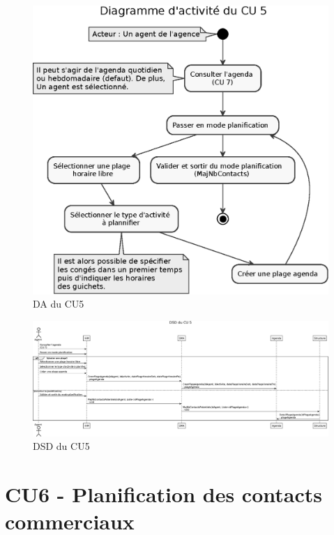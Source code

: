 \begin{figure}[H]
\centering
\includegraphics[width=\textwidth]{figures/eps/DA_CU5.eps}
\caption{DA du CU5}
\end{figure}

\begin{figure}[H]
\centering
\includegraphics[width=26cm, angle=90]{figures/eps/DSD_CU5.eps}
\caption{DSD du CU5}
\end{figure}

\clearpage
\section{CU6 - Planification des contacts commerciaux}

